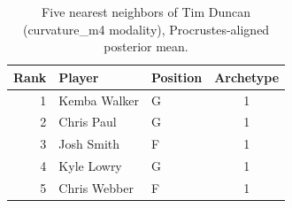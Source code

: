 \begin{table}[htbp]
  \centering\small
  \begin{tabular}{rllc}
    \toprule
    Rank & Player & Position & Archetype \\
    \midrule
    1 & Kemba Walker & G & 1 \\
    2 & Chris Paul & G & 1 \\
    3 & Josh Smith & F & 1 \\
    4 & Kyle Lowry & G & 1 \\
    5 & Chris Webber & F & 1 \\
    \bottomrule
  \end{tabular}
  \caption{Five nearest neighbors of Tim Duncan (curvature_m4 modality), Procrustes-aligned posterior mean.}
  \label{tab:Tim_Duncan_neighbors_curvature_m4}
\end{table}

